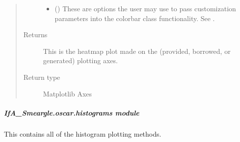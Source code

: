 \documentclass[letterpaper,10pt,english]{sphinxmanual}
\begin{document}
\begin{fulllineitems}
\begin{quote}
\begin{description}
\begin{itemize}
\item {} 
 () \textendash{} These are options the user may use to pass customization parameters
into the colorbar class functionality.
See .

\end{itemize}

\item[{Returns}] \leavevmode
{} \textendash{} This is the heatmap plot made on the (provided, borrowed, or
generated) plotting axes.

\item[{Return type}] \leavevmode
Matplotlib Axes

\end{description}\end{quote}

\end{fulllineitems}



\subparagraph{IfA\_Smeargle.oscar.histograms module}
\label{\detokenize{python_docstrings/IfA_Smeargle.oscar.histograms:module-IfA_Smeargle.oscar.histograms}}\label{\detokenize{python_docstrings/IfA_Smeargle.oscar.histograms:ifa-smeargle-oscar-histograms-module}}\label{\detokenize{python_docstrings/IfA_Smeargle.oscar.histograms::doc}}
This contains all of the histogram plotting methods.
\end{document}
